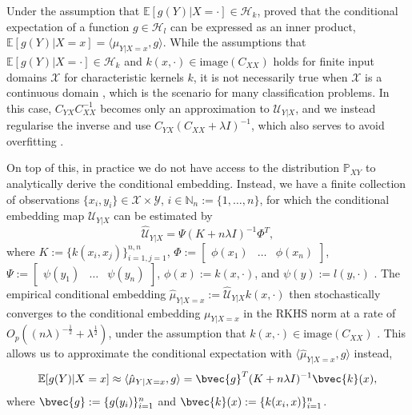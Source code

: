 \documentclass{article}
\begin{document}
	Under the assumption that $\mathbb{E}[g(Y) | X = \cdot] \in \mathcal{H}_{k}$, \citet[Theorem 4]{song2009hilbert} proved that the conditional expectation of a function $g \in \mathcal{H}_{l}$ can be expressed as an inner product, $\mathbb{E}[g(Y) | X = x] = \langle \mu_{Y | X = x}, g \rangle$. While the assumptions that $\mathbb{E}[g(Y) | X = \cdot] \in \mathcal{H}_{k}$ and $k(x, \cdot) \in \mathrm{image}(C_{XX})$ holds for finite input domains $\mathcal{X}$ for characteristic kernels $k$, it is not necessarily true when $\mathcal{X}$ is a continuous domain \citep{fukumizu2004dimensionality}, which is the scenario for many classification problems. In this case, $C_{YX} C_{XX}^{-1}$ becomes only an approximation to $\mathcal{U}_{Y | X}$, and we instead regularise the inverse and use $C_{YX} (C_{XX} + \lambda I)^{-1}$, which also serves to avoid overfitting \citep{song2013kernel}.
	
	On top of this, in practice we do not have access to the distribution $\mathbb{P}_{X Y}$ to analytically derive the conditional embedding. Instead, we have a finite collection of observations $\{x_{i}, y_{i}\} \in \mathcal{X} \times \mathcal{Y}$, $i \in \mathbb{N}_{n} := \{1, \dots, n\}$, for which the conditional embedding map $\mathcal{U}_{Y | X}$ can be estimated by
	\begin{equation}
		\hat{\mathcal{U}}_{Y | X} = \Psi (K + n \lambda I)^{-1} \Phi^{T},
	\label{eq:empirical_conditional_embedding}
	\end{equation}
	where $K := \{k(x_{i}, x_{j})\}_{i = 1, j = 1}^{n, n}$, $\Phi := \begin{bmatrix} \phi(x_{1}) & \dots & \phi(x_{n}) \end{bmatrix}$, $\Psi := \begin{bmatrix} \psi(y_{1}) & \dots & \psi(y_{n}) \end{bmatrix}$, $\phi(x) := k(x, \cdot)$, and $\psi(y) := l(y, \cdot)$ \citep{song2013kernel}. The empirical conditional embedding $\hat{\mu}_{Y | X = x} := \hat{\mathcal{U}}_{Y | X} k(x, \cdot)$ then stochastically converges to the conditional embedding $\mu_{Y | X = x}$ in the RKHS norm at a rate of $O_{p}((n \lambda)^{-\frac{1}{2}} + \lambda^{\frac{1}{2}})$, under the assumption that $k(x, \cdot) \in \mathrm{image}(C_{XX})$ \cite[Theorem 6]{song2009hilbert}. This allows us to approximate the conditional expectation with $\langle \hat{\mu}_{Y | X = x}, g \rangle$ instead, 
	\begin{equation}
		\mathbb{E}[g(Y) | X = x] \approx \langle \hat{\mu}_{Y | X = x}, g \rangle = \bvec{g}^{T} (K + n \lambda I)^{-1} \bvec{k}(x),
	\label{eq:empirical_conditional_expectation}
	\end{equation}
	where $\bvec{g} := \{g(y_{i})\}_{i = 1}^{n}$ and $\bvec{k}(x) := \{k(x_{i}, x)\}_{i = 1}^{n}$.
	
\end{document}
